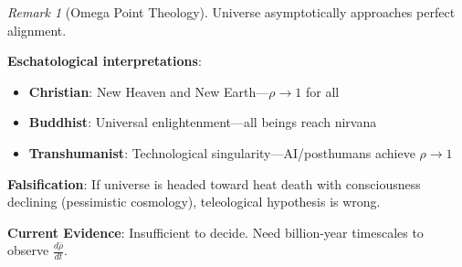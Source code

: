 \documentclass[11pt,a4paper]{article}
\theoremstyle{definition}
\theoremstyle{remark}
\newtheorem{remark}{Remark}[section]
\begin{document}
\begin{small}
\begin{enumerate}
\begin{remark}[Omega Point Theology]
Universe asymptotically approaches perfect alignment.

\textbf{Eschatological interpretations}:
\begin{itemize}
    \item \textbf{Christian}: New Heaven and New Earth—\(\rho \to 1\) for all
    \item \textbf{Buddhist}: Universal enlightenment—all beings reach nirvana
    \item \textbf{Transhumanist}: Technological singularity—AI/posthumans achieve \(\rho \to 1\)
\end{itemize}

\textbf{Falsification}: If universe is headed toward heat death with consciousness declining (pessimistic cosmology), teleological hypothesis is wrong.

\textbf{Current Evidence}: Insufficient to decide. Need billion-year timescales to observe \(\frac{d\bar{\rho}}{dt}\).
\end{remark}

\begin{figure}[H]
\centering
{}
\end{figure}
\end{enumerate}
\end{small}
\end{document}
